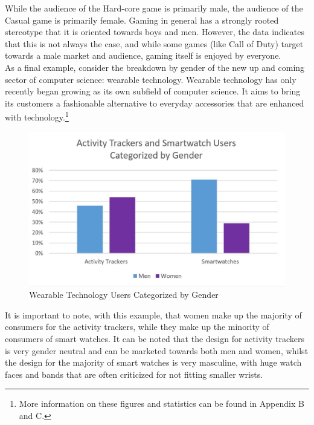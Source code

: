 \documentclass[12pt]{article}
\begin{document}
	While the audience of the Hard-core game is primarily male, the audience of the Casual game is primarily female. Gaming in general has a strongly rooted stereotype that it is oriented towards boys and men. However, the data indicates that this is not always the case, and while some games (like Call of Duty) target towards a male market and audience, gaming itself is enjoyed by everyone. \\
			
	As a final example, consider the breakdown by gender of the new up and coming sector of computer science: wearable technology. Wearable technology has only recently began growing as its own subfield of computer science. It aims to bring its customers a fashionable alternative to everyday accessories that are enhanced with technology.\footnote{More information on these figures and statistics can be found in Appendix B and C.}
	
		\begin{figure}[H]
			\begin{center}
				\includegraphics[]{StatsWear}
				\caption{Wearable Technology Users Categorized by Gender}
			\end{center}
		\end{figure}
	 
	 It is important to note, with this example, that women make up the majority of consumers for the activity trackers, while they make up the minority of consumers of smart watches. It can be noted that the design for activity trackers is very gender neutral and can be marketed towards both men and women, whilst the design for the majority of smart watches is very masculine, with huge watch faces and bands that are often criticized for not fitting smaller wrists.\\
	 
\end{document}

